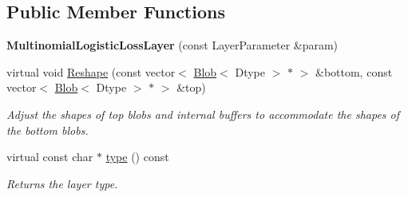 \subsection*{Public Member Functions}
\begin{DoxyCompactItemize}
\item 
{\bfseries Multinomial\+Logistic\+Loss\+Layer} (const Layer\+Parameter \&param)\hypertarget{classcaffe_1_1MultinomialLogisticLossLayer_a1c9567f9901885ec4737cf9315d52081}{}\label{classcaffe_1_1MultinomialLogisticLossLayer_a1c9567f9901885ec4737cf9315d52081}

\item 
virtual void \hyperlink{classcaffe_1_1MultinomialLogisticLossLayer_a906947b9029c3ba8127591c49855ccb6}{Reshape} (const vector$<$ \hyperlink{classcaffe_1_1Blob}{Blob}$<$ Dtype $>$ $\ast$ $>$ \&bottom, const vector$<$ \hyperlink{classcaffe_1_1Blob}{Blob}$<$ Dtype $>$ $\ast$ $>$ \&top)
\begin{DoxyCompactList}\small\item\em Adjust the shapes of top blobs and internal buffers to accommodate the shapes of the bottom blobs. \end{DoxyCompactList}\item 
virtual const char $\ast$ \hyperlink{classcaffe_1_1MultinomialLogisticLossLayer_abae46c53aa81a1517d85d6704f2f71a6}{type} () const \hypertarget{classcaffe_1_1MultinomialLogisticLossLayer_abae46c53aa81a1517d85d6704f2f71a6}{}\label{classcaffe_1_1MultinomialLogisticLossLayer_abae46c53aa81a1517d85d6704f2f71a6}

\begin{DoxyCompactList}\small\item\em Returns the layer type. \end{DoxyCompactList}\end{DoxyCompactItemize}
